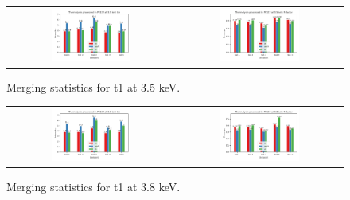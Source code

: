 \begin{figure}[h]
    \centering
    \begin{tabular}{cc}
    \includegraphics[width = 0.5\textwidth]{plots/exp1/tlys_9_P6122/3p5_I_over_sigma.png} & \includegraphics[width = 0.5\textwidth]{plots/exp1/tlys_9_P6122/3p5_rmerges.png}
    \end{tabular}
    \caption{Merging statistics for \ac{t1} at 3.5 keV.}
    \label{fig:tlys_2_p6}
\end{figure}

\begin{figure}[h]
    \centering
    \begin{tabular}{cc}
    \includegraphics[width = 0.5\textwidth]{plots/exp1/tlys_9_P6122/3p8_I_over_sigma.png} & \includegraphics[width = 0.5\textwidth]{plots/exp1/tlys_9_P6122/3p8_rmerges.png}
    \end{tabular}
    \caption{Merging statistics for \ac{t1} at 3.8 keV.}
    \label{fig:tlys_2_p6}
\end{figure}

